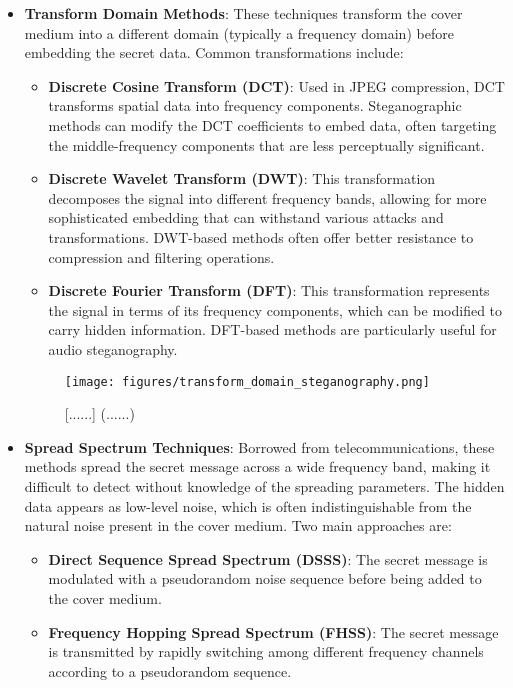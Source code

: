 \documentclass[12pt, a4paper, oneside]{book}
\begin{document}
\begin{itemize}[leftmargin=*]
    \item \textbf{Transform Domain Methods}: These techniques transform the cover medium into a different domain (typically a frequency domain) before embedding the secret data. Common transformations include:
    \begin{itemize}
        \item \textbf{Discrete Cosine Transform (DCT)}: Used in JPEG compression, DCT transforms spatial data into frequency components. Steganographic methods can modify the DCT coefficients to embed data, often targeting the middle-frequency components that are less perceptually significant.
        \item \textbf{Discrete Wavelet Transform (DWT)}: This transformation decomposes the signal into different frequency bands, allowing for more sophisticated embedding that can withstand various attacks and transformations. DWT-based methods often offer better resistance to compression and filtering operations.
        \item \textbf{Discrete Fourier Transform (DFT)}: This transformation represents the signal in terms of its frequency components, which can be modified to carry hidden information. DFT-based methods are particularly useful for audio steganography.
    \end{itemize}

    \begin{figure}[htbp]
        \centering
        \texttt{[image: figures/transform\_domain\_steganography.png]}
        \caption{[......] (......)}
        \label{fig:transform_domain}
    \end{figure}

    \item \textbf{Spread Spectrum Techniques}: Borrowed from telecommunications, these methods spread the secret message across a wide frequency band, making it difficult to detect without knowledge of the spreading parameters. The hidden data appears as low-level noise, which is often indistinguishable from the natural noise present in the cover medium. Two main approaches are:
    \begin{itemize}
        \item \textbf{Direct Sequence Spread Spectrum (DSSS)}: The secret message is modulated with a pseudorandom noise sequence before being added to the cover medium.
        \item \textbf{Frequency Hopping Spread Spectrum (FHSS)}: The secret message is transmitted by rapidly switching among different frequency channels according to a pseudorandom sequence.
    \end{itemize}


\end{itemize}
\end{document}
